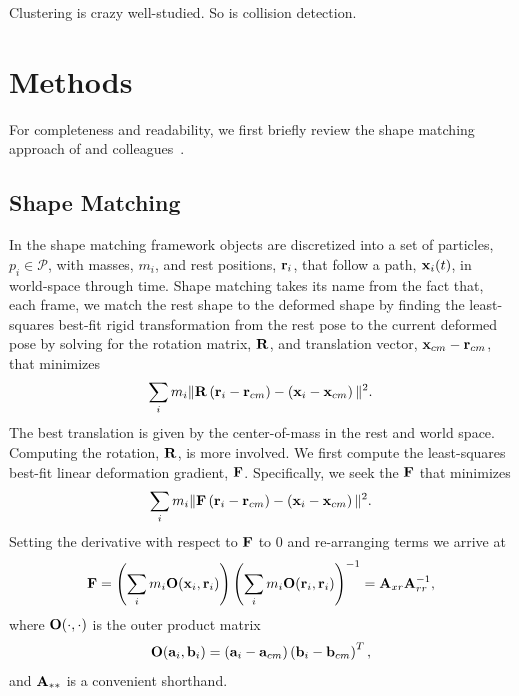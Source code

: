 \documentclass[review]{acmsiggraph}
\begin{document}
Clustering is crazy well-studied.  So is collision detection.

\section{Methods}
For completeness and readability, we first briefly review the shape matching approach of \Mueller and colleagues~.
\subsection{Shape Matching}
\label{sec:ShapeMatching}
In the shape matching framework
objects are discretized into a set of particles, $p_i\in\mathcal{P}$, with masses, $m_i$, and rest positions, $\mathit{\mathbf{r}}_i$, 
that follow a path, $\mathit{\mathbf{x}}_i(t)$, in world-space through time.  
Shape matching takes its name from the fact that, each frame, we match the rest shape to 
the deformed shape by finding
the least-squares best-fit rigid transformation from the rest pose
to the current deformed pose by
solving for the rotation matrix, $\mathit{\mathbf{R}}$, and translation
vector, $\mathit{\mathbf{x}}_{cm}-\mathit{\mathbf{r}}_{cm}$, that minimizes
\begin{equation}
\label{eq:sm}
\sum_i m_i \| \mathit{\mathbf{R}}\left(\mathit{\mathbf{r}}_i - \mathit{\mathbf{r}}_{cm}\right)-\left(\mathit{\mathbf{x}}_i-\mathit{\mathbf{x}}_{cm}\right)\|^2.
\end{equation}
The best translation is given by the center-of-mass in the rest and world space.  
Computing the rotation, $\mathit{\mathbf{R}}$, is more involved.  
We first compute the least-squares best-fit linear deformation gradient, $\mathit{\mathbf{F}}$.
Specifically, we seek the $\mathit{\mathbf{F}}$ that minimizes
\begin{equation}
\sum_i m_i \| \mathit{\mathbf{F}}\left(\mathit{\mathbf{r}}_i - \mathit{\mathbf{r}}_{cm}\right)-\left(\mathit{\mathbf{x}}_i-\mathit{\mathbf{x}}_{cm}\right)\|^2.
\end{equation}
Setting the derivative with respect to $\mathit{\mathbf{F}}$ to $0$ and re-arranging terms we arrive at
\begin{equation}
\label{eq:defgrad}
\mathit{\mathbf{F}} = \left(\sum_i m_i \mathit{\mathbf{O}}(\mathit{\mathbf{x}}_i,\mathit{\mathbf{r}}_i)\right)\left(\sum_im_i\mathit{\mathbf{O}}(\mathit{\mathbf{r}}_i,\mathit{\mathbf{r}}_i)\right)^{-1} = \mathit{\mathbf{A}}_{xr}\mathit{\mathbf{A}}_{rr}^{-1},
\end{equation}
where $\mathit{\mathbf{O}}(\cdot,\cdot)$ is the outer product matrix
\begin{equation}
\mathit{\mathbf{O}}(\mathit{\mathbf{a}}_i,\mathit{\mathbf{b}}_i) = \left(\mathit{\mathbf{a}}_i-\mathit{\mathbf{a}}_{cm}\right)\left(\mathit{\mathbf{b}}_{i}-\mathit{\mathbf{b}}_{cm}\right)^T,
\end{equation}
and $\mathit{\mathbf{A}}_{**}$ is a convenient shorthand.
\end{document}
